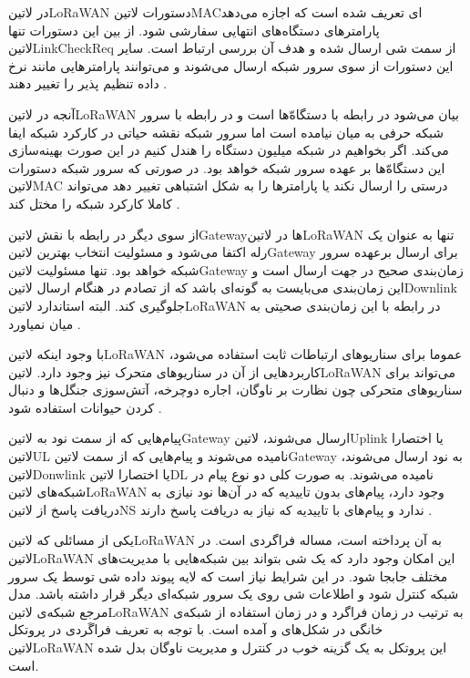 در ‌لاتین{LoRaWAN} دستورات ‌لاتین{MAC}ای تعریف شده است که اجازه می‌دهد پارامترهای دستگاه‌های انتهایی سفارشی شود.
از بین این دستورات تنها ‌لاتین{LinkCheckReq} از سمت شی ارسال شده و هدف آن بررسی ارتباط است.
سایر این دستورات از سوی سرور شبکه ارسال می‌شوند و می‌توانند پارامترهایی مانند نرخ داده تنظیم پذیر را تغییر دهند
.

آنجه در ‌لاتین{LoRaWAN} بیان می‌شود در رابطه با دستگاه‌ّها است و در رابطه با سرور شبکه حرفی به میان نیامده است اما سرور شبکه نقشه حیاتی در کارکرد شبکه ایفا می‌کند.
اگر بخواهیم در شبکه میلیون دستگاه را هندل کنیم در این صورت بهینه‌سازی این دستگاه‌ّها بر عهده سرور شبکه خواهد بود. در صورتی که سرور شبکه دستورات ‌لاتین{MAC}
درستی را ارسال نکند یا پارامترها را به شکل اشتباهی تغییر دهد می‌تواند کاملا کارکرد شبکه را مختل کند
.

از سوی دیگر در رابطه با نقش ‌لاتین{Gateway}ها در ‌لاتین{LoRaWAN} تنها به عنوان یک رله اکتفا می‌شود و مسئولیت انتخاب بهترین ‌لاتین{Gateway} برای ارسال
برعهده سرور شبکه خواهد بود. تنها مسئولیت ‌لاتین{Gateway} زمان‌بندی صحیح در جهت ارسال است و این زمان‌بندی می‌بایست به گونه‌ای باشد که از تصادم در هنگام ارسال
‌لاتین{Downlink} جلوگیری کند. البته استاندارد ‌لاتین{LoRaWAN} در رابطه با این زمان‌بندی صحیتی به میان نمیاورد
.

با وجود اینکه ‌لاتین{LoRaWAN} عموما برای سناریوهای ارتباطات ثابت استفاده می‌شود، کاربردهایی از آن در سناریوهای متحرک نیز وجود دارد.
‌لاتین{LoRaWAN} می‌تواند برای سناریوهای متحرکی چون نظارت بر ناوگان، اجاره دوچرخه، آتش‌سوزی جنگل‌ها و دنبال کردن حیوانات
استفاده شود .

پیام‌هایی که از سمت نود به ‌لاتین{Gateway} ارسال می‌شوند، ‌لاتین{Uplink} یا اختصارا ‌لاتین{UL} نامیده می‌شوند و
پیام‌هایی که از سمت ‌لاتین{Gateway} به نود ارسال می‌شوند، ‌لاتین{Donwlink} یا اختصارا ‌لاتین{DL} نامیده می‌شوند.
به صورت کلی دو نوع پیام در شبکه‌های ‌لاتین{LoRaWAN} وجود دارد، پیام‌های بدون تاییدیه که در آن‌ها نود نیازی به دریافت پاسخ
از ‌لاتین{NS} ندارد و پیام‌های با تاییدیه که نیاز به دریافت پاسخ دارند
.

یکی از مسائلی که ‌لاتین{LoRaWAN} به آن پرداخته است، مساله فراگردی است. در ‌لاتین{LoRaWAN} این امکان وجود دارد
که یک شی بتواند بین شبکه‌هایی با مدیریت‌های مختلف جابجا شود. در این شرایط نیاز است که لایه پیوند داده شی توسط یک
سرور شبکه کنترل شود و اطلاعات شی روی یک سرور شبکه‌ای دیگر قرار داشته باشد. مدل مرجع شبکه‌ی ‌لاتین{LoRaWAN}
به ترتیب در زمان فراگرد و در زمان استفاده از شبکه‌ی خانگی در شکل‌های 
و  آمده است.
با توجه به تعریف فراگَردی در پروتکل ‌لاتین{LoRaWAN} این پروتکل به یک گزینه خوب در کنترل و مدیریت ناوگان بدل شده است.

